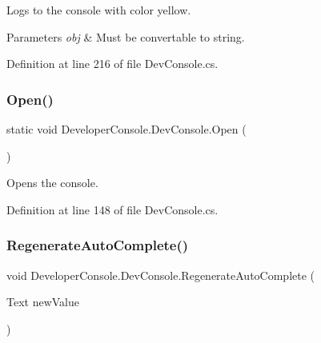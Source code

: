 Logs to the console with color yellow. 


\begin{DoxyParams}{Parameters}
{\em obj} & Must be convertable to string.\\
\hline
\end{DoxyParams}


Definition at line 216 of file Dev\+Console.\+cs.

\mbox{\label{class_developer_console_1_1_dev_console_a45deaa2419420ca87dbd424b1d5ad47f}} 
\subsubsection{\texorpdfstring{Open()}{Open()}}
{\footnotesize\ttfamily static void Developer\+Console.\+Dev\+Console.\+Open (\begin{DoxyParamCaption}{ }\end{DoxyParamCaption})\hspace{0.3cm}{\ttfamily [static]}}



Opens the console. 



Definition at line 148 of file Dev\+Console.\+cs.

\mbox{\label{class_developer_console_1_1_dev_console_aaa079c848c38afe4832fea2a4add51a3}} 
\subsubsection{\texorpdfstring{Regenerate\+Auto\+Complete()}{RegenerateAutoComplete()}}
{\footnotesize\ttfamily void Developer\+Console.\+Dev\+Console.\+Regenerate\+Auto\+Complete (\begin{DoxyParamCaption}\item[{Text}]{new\+Value }\end{DoxyParamCaption})}



